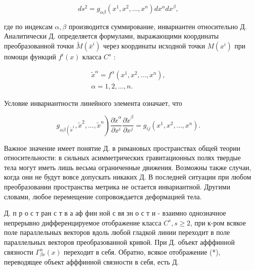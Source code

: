 \documentclass[10pt]{article}
\begin{document}
\[

d s^{2}=g_{\alpha \beta}\left(x^{1}, x^{2}, \ldots, x^{n}\right) d x^{\alpha} d x^{\beta},

\]



где по индексам $\alpha, \beta$ производится суммирование, инвариантен относительно Д. Аналитически Д. определяется формулами, выражающими координаты преобразованной точки $\tilde{M}\left(\bar{x}^{i}\right)$ через координаты исходной точки $M\left(x^{i}\right)$ при помощи функций $f^{i}(x)$ класса $C^{s}$ :



\[

\begin{gathered}

\tilde{x}^{\alpha}=f^{\alpha}\left(x^{1}, x^{2}, \ldots, x^{n}\right), \\

\alpha=1,2, \ldots, n .

\end{gathered}

\]



Условие инвариантности линейного элемента означает, что



\[

\left.g_{\alpha \beta\left(\tilde{x}^{1}\right.}, \tilde{x}^{2}, \ldots, \tilde{x}^{n}\right) \frac{\partial \tilde{x}^{\alpha}}{\partial x^{i}} \frac{\partial \tilde{x}^{\beta}}{\partial x^{j}}=g_{i j}\left(x^{1}, x^{2}, \ldots, x^{n}\right) .

\]



Важное значение имеет понятие Д. в римановых пространствах общей теории относительности: в сильных асимметрических гравитационных полях твердые тела могут иметь лишь весьма ограниченные движения. Возможны также случаи, когда они не будут вовсе допускать никаких Д. В последней ситуации при любом преобразовании пространства метрика не остается инвариантной. Другими словами, любое перемещение сопровождается деформацией тела.



Д. п р о с т ран с т в а аф фин ной с вя зн о с т и - взаимно однозначное непрерывно дифференцируемое отображение класса $C^{s}, s \geqslant 2$, при к-ром всякое поле параллельных векторов вдоль любой гладкой линии переходит в поле параллельных векторов преобразованной кривой. При Д. объект афффинной связности $\Gamma_{\beta \nu}^{\alpha}(x)$ переходит в себя. Обратно, всякое отображение (*), переводящее объект афффинной связности в себя, есть Д.
\end{document}
